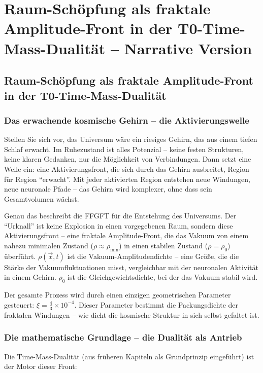 \chapter{Raum-Schöpfung als fraktale Amplitude-Front in der T0-Time-Mass-Dualität – Narrative Version}


\section{Raum-Schöpfung als fraktale Amplitude-Front in der T0-Time-Mass-Dualität}
	
	\subsection*{Das erwachende kosmische Gehirn – die Aktivierungswelle}
	
	Stellen Sie sich vor, das Universum wäre ein riesiges Gehirn, das aus einem tiefen Schlaf erwacht. Im Ruhezustand ist alles Potenzial – keine festen Strukturen, keine klaren Gedanken, nur die Möglichkeit von Verbindungen. Dann setzt eine Welle ein: eine Aktivierungsfront, die sich durch das Gehirn ausbreitet, Region für Region \enquote{erwacht}. Mit jeder aktivierten Region entstehen neue Windungen, neue neuronale Pfade – das Gehirn wird komplexer, ohne dass sein Gesamtvolumen wächst.
	
	Genau das beschreibt die FFGFT für die Entstehung des Universums. Der \enquote{Urknall} ist keine Explosion in einen vorgegebenen Raum, sondern diese Aktivierungsfront – eine fraktale Amplitude-Front, die das Vakuum von einem nahezu minimalen Zustand ($\rho \approx \rho_{\min}$) in einen stabilen Zustand ($\rho = \rho_0$) überführt. $\rho(\vec{x},t)$ ist die Vakuum-Amplitudendichte – eine Größe, die die Stärke der Vakuumfluktuationen misst, vergleichbar mit der neuronalen Aktivität in einem Gehirn. $\rho_0$ ist die Gleichgewichtsdichte, bei der das Vakuum stabil wird.
	
	Der gesamte Prozess wird durch einen einzigen geometrischen Parameter gesteuert: $\xi = \frac{4}{3} \times 10^{-4}$. Dieser Parameter bestimmt die Packungsdichte der fraktalen Windungen – wie dicht die kosmische Struktur in sich selbst gefaltet ist.
	
	\subsection*{Die mathematische Grundlage – die Dualität als Antrieb}
	
	Die Time-Mass-Dualität (aus früheren Kapiteln als Grundprinzip eingeführt) ist der Motor dieser Front:
	
